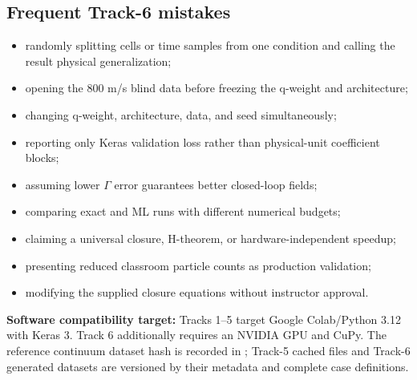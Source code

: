 \documentclass[11pt]{article}
\newcommand{\file}[1]{\path{#1}}
\begin{document}
\subsection{Frequent Track-6 mistakes}
\begin{itemize}
\item randomly splitting cells or time samples from one condition and calling the result physical generalization;
\item opening the 800 m/s blind data before freezing the q-weight and architecture;
\item changing q-weight, architecture, data, and seed simultaneously;
\item reporting only Keras validation loss rather than physical-unit coefficient blocks;
\item assuming lower $\Gamma$ error guarantees better closed-loop fields;
\item comparing exact and ML runs with different numerical budgets;
\item claiming a universal closure, H-theorem, or hardware-independent speedup;
\item presenting reduced classroom particle counts as production validation;
\item modifying the supplied closure equations without instructor approval.
\end{itemize}

\noindent\begin{minipage}{\textwidth}
\begin{tcolorbox}[colback=lightblue,colframe=blue2,title=Central message,fonttitle=\bfseries,unbreakable]
\textbf{Software compatibility target:} Tracks 1--5 target Google Colab/Python 3.12 with Keras 3. Track 6 additionally requires an NVIDIA GPU and CuPy. The reference continuum dataset hash is recorded in \file{reproducibility.txt}; Track-5 cached files and Track-6 generated datasets are versioned by their metadata and complete case definitions.
\end{tcolorbox}
\end{minipage}
\end{document}
